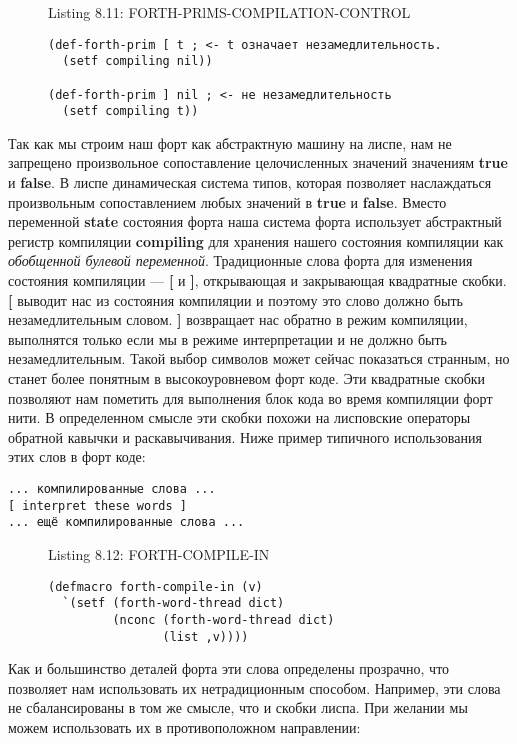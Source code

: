 \begin{figure}Listing 8.11: FORTH-PRlMS-COMPILATION-CONTROL\label{listing_8.11}
\listbegin
\begin{verbatim}
(def-forth-prim [ t ; <- t означает незамедлительность.
  (setf compiling nil))

(def-forth-prim ] nil ; <- не незамедлительность
  (setf compiling t))
\end{verbatim}
\listend
\end{figure}

Так как мы строим наш форт как абстрактную машину на лиспе, нам не запрещено произвольное сопоставление целочисленных значений значениям \textbf{true} и \textbf{false}. В лиспе динамическая система типов, которая позволяет наслаждаться произвольным сопоставлением любых значений в \textbf{true} и \textbf{false}. Вместо переменной \textbf{state} состояния форта наша система форта использует абстрактный регистр компиляции \textbf{compiling} для хранения нашего состояния компиляции как \emph{обобщенной булевой переменной}. Традиционные слова форта для изменения состояния компиляции --- \textbf{[} и \textbf{]}, открывающая и закрывающая квадратные скобки. \textbf{[} выводит нас из состояния компиляции и поэтому это слово должно быть незамедлительным словом. \textbf{]} возвращает нас обратно в режим компиляции, выполнятся только если мы в режиме интерпретации и не должно быть незамедлительным. Такой выбор символов может сейчас показаться странным, но станет более понятным в высокоуровневом форт коде. Эти квадратные скобки позволяют нам пометить для выполнения блок кода во время компиляции форт нити. В определенном смысле эти скобки похожи на лисповские операторы обратной кавычки и раскавычивания. Ниже пример типичного использования этих слов в форт коде:

\begin{verbatim}
... компилированные слова ...
[ interpret these words ]
... ещё компилированные слова ...
\end{verbatim}

\begin{figure}Listing 8.12: FORTH-COMPILE-IN\label{listing_8.12}
\listbegin
\begin{verbatim}
(defmacro forth-compile-in (v)
  `(setf (forth-word-thread dict)
         (nconc (forth-word-thread dict)
                (list ,v))))
\end{verbatim}
\listend
\end{figure}

Как и большинство деталей форта эти слова определены прозрачно, что позволяет нам использовать их нетрадиционным способом. Например, эти слова не сбалансированы в том же смысле, что и скобки лиспа. При желании мы можем использовать их в противоположном направлении:

